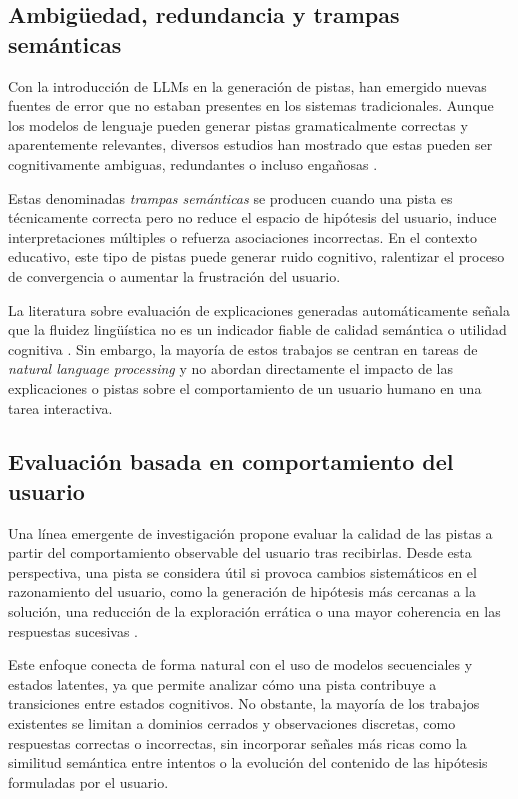 \documentclass[../main.tex]{subfiles}
\begin{document}
\subsection{Ambigüedad, redundancia y trampas semánticas}

Con la introducción de LLMs en la generación de pistas, han emergido nuevas fuentes de error que no estaban presentes en los sistemas tradicionales. Aunque los modelos de lenguaje pueden generar pistas gramaticalmente correctas y aparentemente relevantes, diversos estudios han mostrado que estas pueden ser cognitivamente ambiguas, redundantes o incluso engañosas \cite{Maynez2020Faithfulness}.

Estas denominadas \textit{trampas semánticas} se producen cuando una pista es técnicamente correcta pero no reduce el espacio de hipótesis del usuario, induce interpretaciones múltiples o refuerza asociaciones incorrectas. En el contexto educativo, este tipo de pistas puede generar ruido cognitivo, ralentizar el proceso de convergencia o aumentar la frustración del usuario.

La literatura sobre evaluación de explicaciones generadas automáticamente señala que la fluidez lingüística no es un indicador fiable de calidad semántica o utilidad cognitiva \cite{Wiegreffe2021MeasuringExplanations}. Sin embargo, la mayoría de estos trabajos se centran en tareas de \textit{natural language processing} y no abordan directamente el impacto de las explicaciones o pistas sobre el comportamiento de un usuario humano en una tarea interactiva.

\subsection{Evaluación basada en comportamiento del usuario}

Una línea emergente de investigación propone evaluar la calidad de las pistas a partir del comportamiento observable del usuario tras recibirlas. Desde esta perspectiva, una pista se considera útil si provoca cambios sistemáticos en el razonamiento del usuario, como la generación de hipótesis más cercanas a la solución, una reducción de la exploración errática o una mayor coherencia en las respuestas sucesivas \cite{Koedinger2012DataDrivenHints}.

Este enfoque conecta de forma natural con el uso de modelos secuenciales y estados latentes, ya que permite analizar cómo una pista contribuye a transiciones entre estados cognitivos. No obstante, la mayoría de los trabajos existentes se limitan a dominios cerrados y observaciones discretas, como respuestas correctas o incorrectas, sin incorporar señales más ricas como la similitud semántica entre intentos o la evolución del contenido de las hipótesis formuladas por el usuario.
\end{document}
